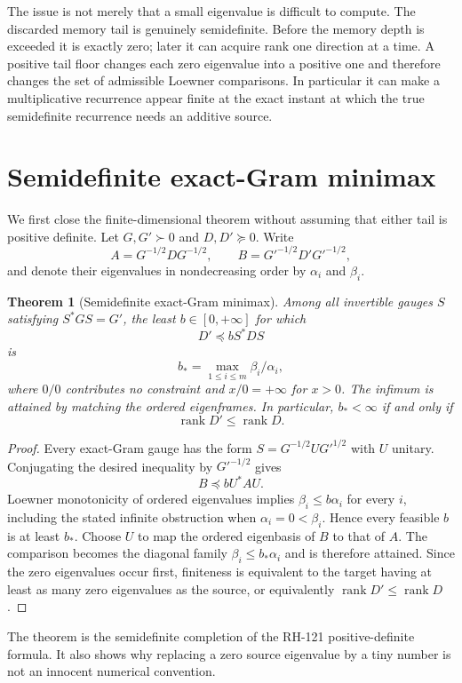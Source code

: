 \documentclass[12pt]{article}
\newtheorem{theorem}{Theorem}
\newcommand{\rank}{\operatorname{rank}}
\begin{document}
The issue is not merely that a small eigenvalue is difficult to compute.
The discarded memory tail is genuinely semidefinite.  Before the memory
depth is exceeded it is exactly zero; later it can acquire rank one
direction at a time.  A positive tail floor changes each zero eigenvalue
into a positive one and therefore changes the set of admissible Loewner
comparisons.  In particular it can make a multiplicative recurrence appear
finite at the exact instant at which the true semidefinite recurrence needs
an additive source.

\section{Semidefinite exact-Gram minimax}
We first close the finite-dimensional theorem without assuming that either
tail is positive definite.  Let $G,G'\succ0$ and $D,D'\succeq0$.  Write
\[
 A=G^{-1/2}DG^{-1/2},\qquad
 B=G'^{-1/2}D'G'^{-1/2},
\]
and denote their eigenvalues in nondecreasing order by $\alpha_i$ and
$\beta_i$.

\begin{theorem}[Semidefinite exact-Gram minimax]\label{thm:minimax}
Among all invertible gauges $S$ satisfying $S^*GS=G'$, the least
$b\in[0,+\infty]$ for which
\[
 D'\preceq bS^*DS
\]
is
\[
 b_* = \max_{1\leq i\leq m}\beta_i/\alpha_i,
\]
where $0/0$ contributes no constraint and $x/0=+\infty$ for $x>0$.
The infimum is attained by matching the ordered eigenframes.  In
particular, $b_*<\infty$ if and only if
\[
 \rank D'\leq \rank D.
\]
\end{theorem}

\begin{proof}
Every exact-Gram gauge has the form
$S=G^{-1/2}UG'^{1/2}$ with $U$ unitary.  Conjugating the desired inequality
by $G'^{-1/2}$ gives
\[
 B\preceq bU^*AU.
\]
Loewner monotonicity of ordered eigenvalues implies
$\beta_i\leq b\alpha_i$ for every $i$, including the stated infinite
obstruction when $\alpha_i=0<\beta_i$.  Hence every feasible $b$ is at
least $b_*$.  Choose $U$ to map the ordered eigenbasis of $B$ to that of
$A$.  The comparison becomes the diagonal family
$\beta_i\leq b_*\alpha_i$ and is therefore attained.  Since the zero
eigenvalues occur first, finiteness is equivalent to the target having at
least as many zero eigenvalues as the source, or equivalently
$\rank D'\leq\rank D$.
\end{proof}

The theorem is the semidefinite completion of the RH-121 positive-definite
formula.  It also shows why replacing a zero source eigenvalue by a tiny
number is not an innocent numerical convention.
\end{document}
